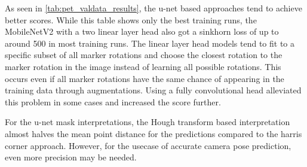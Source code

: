 \documentclass[10pt]{book}
\begin{document}
As seen in \autoref{tab:pet_valdata_results}, the u-net based approaches tend to achieve better scores. While this table shows only the best training runs, the MobileNetV2 with a two linear layer head also got a sinkhorn loss of up to around 500 in most training runs. %
The linear layer head models tend to fit to a specific subset of all marker rotations and choose the closest rotation to the marker rotation in the image instead of learning all possible rotations. This occurs even if all marker rotations have the same chance of appearing in the training data through augmentations. Using a fully convolutional head alleviated this problem in some cases and increased the score further.

For the u-net mask interpretations, the Hough transform based interpretation almost halves the mean point distance for the predictions compared to the harris corner approach. However, for the usecase of accurate camera pose prediction, even more precision may be needed.
\end{document}
